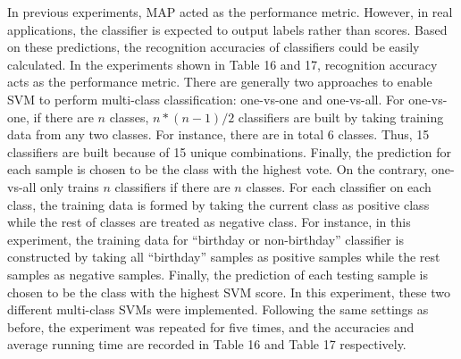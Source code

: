 \begin{table}[!ht]
  \begin{center}
    \end{center}
    \caption{Average running time (seconds) for all methods using different SVM multi-class schemes}
\end{table}

\noindent In previous experiments, MAP acted as the performance metric. However, in real applications, the classifier is expected to output labels rather than scores. Based on these predictions, the recognition accuracies of classifiers could be easily calculated. In the experiments shown in Table 16 and 17, recognition accuracy acts as the performance metric. There are generally two approaches to enable SVM to perform multi-class classification: one-vs-one and one-vs-all. For one-vs-one, if there are $n$ classes, $n * (n - 1) / 2$ classifiers are built by taking training data from any two classes. For instance, there are in total 6 classes. Thus, 15 classifiers are built because of 15 unique combinations. Finally, the prediction for each sample is chosen to be the class with the highest vote. On the contrary, one-vs-all only trains $n$ classifiers if there are $n$ classes. For each classifier on each class, the training data is formed by taking the current class as positive class while the rest of classes are treated as negative class. For instance, in this experiment, the training data for ``birthday or non-birthday'' classifier is constructed by taking all ``birthday'' samples as positive samples while the rest samples as negative samples. Finally, the prediction of each testing sample is chosen to be the class with the highest SVM score. In this experiment, these two different multi-class SVMs were implemented. Following the same settings as before, the experiment was repeated for five times, and the accuracies and average running time are recorded in Table 16 and Table 17 respectively. \\ 


